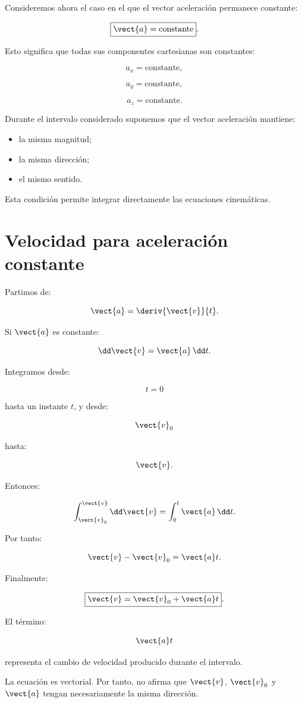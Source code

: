Consideremos ahora el caso en el que el vector aceleración permanece constante:

\[
\boxed{
\vect{a}=\text{constante}
}.
\]

Esto significa que todas sus componentes cartesianas son constantes:

\[
a_x=\text{constante},
\]

\[
a_y=\text{constante},
\]

\[
a_z=\text{constante}.
\]

\begin{modelo}
Durante el intervalo considerado suponemos que el vector aceleración mantiene:

\begin{itemize}
    \item la misma magnitud;
    \item la misma dirección;
    \item el mismo sentido.
\end{itemize}

Esta condición permite integrar directamente las ecuaciones cinemáticas.
\end{modelo}


\section{Velocidad para aceleración constante}

Partimos de:

\[
\vect{a}
=
\deriv{\vect{v}}{t}.
\]

Si \(\vect{a}\) es constante:

\[
\dd\vect{v}
=
\vect{a}\,\dd t.
\]

Integramos desde:

\[
t=0
\]

hasta un instante \(t\), y desde:

\[
\vect{v}_0
\]

hasta:

\[
\vect{v}.
\]

Entonces:

\[
\int_{\vect{v}_0}^{\vect{v}}
\dd\vect{v}
=
\int_0^t
\vect{a}\,\dd t.
\]

Por tanto:

\[
\vect{v}-\vect{v}_0
=
\vect{a}t.
\]

Finalmente:

\[
\boxed{
\vect{v}
=
\vect{v}_0+\vect{a}t
}.
\]

\begin{interpretacion}
El término:

\[
\vect{a}t
\]

representa el cambio de velocidad producido durante el intervalo.

La ecuación es vectorial. Por tanto, no afirma que \(\vect{v}\),
\(\vect{v}_0\) y \(\vect{a}\) tengan necesariamente la misma dirección.
\end{interpretacion}


